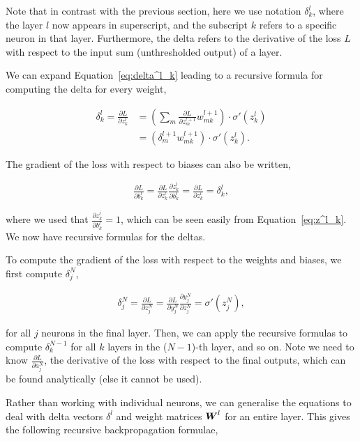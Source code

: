 Note that in contrast with the previous section, here we use notation \(\delta^l_k\), where the layer \(l\) now appears in superscript, and the subscript \(k\) refers to a specific neuron in that layer.
Furthermore, the delta refers to the derivative of the loss \(L\) with respect to the input sum (unthresholded output) of a layer.

We can expand Equation~\ref{eq:delta^l_k} leading to a recursive formula for computing the delta for every weight,

\begin{align}
    \delta^l_k = \frac{\partial L}{\partial z^l_k} &= \left(
        \sum_{m} \frac{\partial L}{\partial z^{l+1}_m} w^{l+1}_{mk}
    \right) \cdot
    \sigma'(z^l_k) \\
    &= \left(
        \delta^{l+1}_m w^{l+1}_{mk}
    \right) \cdot
    \sigma'(z^l_k).
\end{align}

The gradient of the loss with respect to biases can also be written,

\begin{align}
    \frac{\partial L}{\partial b^l_k} = \frac{\partial L}{\partial z^l_k} \frac{\partial z^l_k}{\partial b^l_k} = \frac{\partial L}{\partial z^l_k} = \delta^l_k,
\end{align}

where we used that \(\frac{\partial z^l_k}{\partial b^l_k} = 1\), which can be seen easily from Equation~\ref{eq:z^l_k}.
We now have recursive formulas for the deltas.

To compute the gradient of the loss with respect to the weights and biases, we first compute \(\delta^N_j\),

\begin{align}
    \delta^N_j = \frac{\partial L}{\partial z^N_j} = \frac{\partial L}{\partial y^N_j} \frac{\partial y^N_j}{\partial z^N_j} = \sigma'(z^N_j),
\end{align}

for all \(j\) neurons in the final layer. Then, we can apply the recursive formulas to compute \(\delta^{N-1}_k\) for all \(k\) layers in the (\(N-1\))-th layer, and so on.
Note we need to know \(\frac{\partial L}{\partial a^N_j}\), the derivative of the loss with respect to the final outputs, which can be found analytically (else it cannot be used).

Rather than working with individual neurons, we can generalise the equations to deal with delta vectors \(\delta^l\) and weight matrices \({\boldsymbol{{W}}}^l\) for an entire layer.
This gives the following recursive backpropagation formulae,

